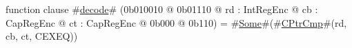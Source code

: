 function clause #\hyperref[sailMIPSzdecode]{decode}# (0b010010 @ 0b01110 @ rd : IntRegEnc @ cb : CapRegEnc @ ct : CapRegEnc @ 0b000 @ 0b110) = #\hyperref[sailMIPSzSome]{Some}#(#\hyperref[sailMIPSzCPtrCmp]{CPtrCmp}#(rd, cb, ct, CEXEQ))
